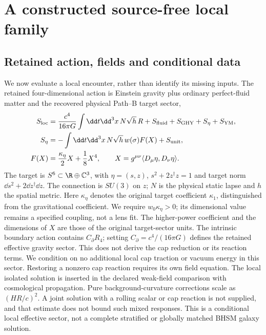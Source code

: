 \section{A constructed source-free local family}
\label{sec:sl-local-family}
\subsection{Retained action, fields and conditional data}
We now evaluate a local encounter, rather than identify its missing inputs.
The retained four-dimensional action is Einstein gravity plus ordinary
perfect-fluid matter and the recovered physical Path--B target sector,
\begin{align}
 S_{\rm loc}&=\frac{c^4}{16\pi G}\int\dd t\dd^3x\,N\sqrt h\,R
       +S_{\rm fluid}+S_{\rm GHY}+S_\eta+S_{\rm YM},\\
 S_\eta&=-\int\dd t\dd^3x\,N\sqrt h\,w(\sigma)F(X)+S_{\rm unit},\\
 F(X)&=\frac{\kappa_\eta}{2}X+\frac18X^4,
 \qquad X=g^{\mu\nu}\langle D_\mu\eta,D_\nu\eta\rangle .
 \label{eq:sl-local-action}
\end{align}
The target is $S^6\subset\R\oplus\mathbb C^3$, with
$\eta=(s,z)$, $s^2+2z^\dagger z=1$ and target norm
$\dd s^2+2\dd z^\dagger\dd z$. The connection is $SU(3)$ on $z$;
$N$ is the physical static lapse and $h$ the spatial metric.
Here $\kappa_\eta$ denotes the original target coefficient $\kappa_1$,
distinguished from the gravitational coefficient. We require
$w_0\kappa_\eta>0$; its dimensional value remains a specified coupling,
not a lens fit. The higher-power coefficient and the dimensions of $X$
are those of the original target-sector units.
The intrinsic boundary action contains $C_\partial R_4$; setting
$C_\partial=c^4/(16\pi G)$ defines the retained effective gravity sector.
This does not derive the cap reduction or its reaction terms.
We condition on no additional local cap traction or vacuum energy in this
sector. Restoring a nonzero cap reaction requires its own field equation.
The local isolated solution is inserted in the declared weak-field
comparison with cosmological propagation. Pure background-curvature
corrections scale as $(H R/c)^2$. A joint solution with a rolling scalar
or cap reaction is not supplied, and that estimate does not bound such
mixed responses. This is a conditional local effective sector, not a
complete stratified or globally matched BHSM galaxy solution.

